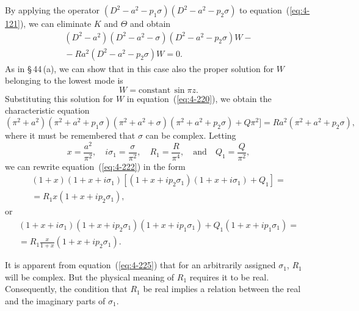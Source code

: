 By applying the operator $(D^2-a^2-p_1\sigma)(D^2-a^2-p_2\sigma)$ to equation~(\ref{eq:4-121}), we can eliminate $K$ and $\Theta$ and obtain
\begin{multline}
\label{eq:4-220}
(D^2-a^2)(D^2-a^2-\sigma)(D^2-a^2-p_2\sigma)W - {} \\
{} - Ra^2(D^2-a^2-p_2\sigma)W = 0.
\end{multline}
As in \S\,44\,(a), we can show that in this case also the proper solution for $W$ belonging to the lowest mode is
\begin{equation}
\label{eq:4-221}
W = \text{constant}\,\sin\pi z.
\end{equation}
Substituting this solution for $W$ in equation~(\ref{eq:4-220}), we obtain the characteristic equation
\begin{equation}
\label{eq:4-222}
(\pi^2+a^2)(\pi^2+a^2+p_1\sigma)(\pi^2+a^2+\sigma)(\pi^2+a^2+p_2\sigma)+Q\pi^2] = Ra^2(\pi^2+a^2+p_2\sigma),
\end{equation}
where it must be remembered that $\sigma$ can be complex. Letting
\begin{equation}
\label{eq:4-223}
x = \frac{a^2}{\pi^2}, \quad i\sigma_1 = \frac{\sigma}{\pi^2}, \quad R_1 = \frac{R}{\pi^4}, \quad\text{and}\quad Q_1 = \frac{Q}{\pi^2},
\end{equation}
we can rewrite equation~(\ref{eq:4-222}) in the form
\begin{multline}
\label{eq:4-224}
(1+x)(1+x+i\sigma_1)[(1+x+ip_2\sigma_1)(1+x+i\sigma_1)+Q_1] = {} \\
{} = R_1 x(1+x+ip_2\sigma_1),
\end{multline}
or
\begin{multline}
\label{eq:4-225}
(1+x+i\sigma_1)(1+x+ip_2\sigma_1)(1+x+ip_1\sigma_1)+Q_1(1+x+ip_1\sigma_1) = {} \\
{} = R_1\frac{x}{1+x}(1+x+ip_2\sigma_1).
\end{multline}

It is apparent from equation~(\ref{eq:4-225}) that for an arbitrarily assigned $\sigma_1$, $R_1$ will be complex. But the physical meaning of $R_1$ requires it to be real. Consequently, the condition that $R_1$ be real implies a relation between the real and the imaginary parts of $\sigma_1$.

